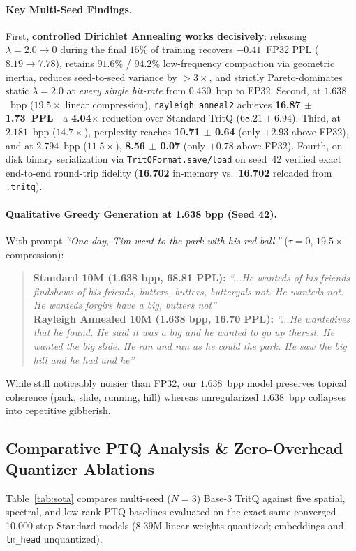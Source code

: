 \documentclass[11pt,a4paper]{article}
\begin{document}
\paragraph{Key Multi-Seed Findings.}
First, \textbf{controlled Dirichlet Annealing works decisively}: releasing $\lambda = 2.0 \to 0$ during the final $15\%$ of training recovers $-0.41$~FP32 PPL ($8.19 \to 7.78$), retains $91.6\%$ / $94.2\%$ low-frequency compaction via geometric inertia, reduces seed-to-seed variance by $>3\times$, and strictly Pareto-dominates static $\lambda=2.0$ at \emph{every single bit-rate} from $0.430$~bpp to FP32. Second, at $1.638$~bpp ($19.5\times$ linear compression), \texttt{rayleigh\_anneal2} achieves \textbf{16.87 $\pm$ 1.73~PPL}---a \textbf{4.04$\times$} reduction over Standard TritQ ($68.21 \pm 6.94$). Third, at $2.181$~bpp ($14.7\times$), perplexity reaches \textbf{10.71 $\pm$ 0.64} (only $+2.93$ above FP32), and at $2.794$~bpp ($11.5\times$), \textbf{8.56 $\pm$ 0.07} (only $+0.78$ above FP32). Fourth, on-disk binary serialization via \texttt{TritQFormat.save/load} on seed~42 verified exact end-to-end round-trip fidelity (\textbf{16.702} in-memory vs.\ \textbf{16.702} reloaded from \texttt{.tritq}).

\paragraph{Qualitative Greedy Generation at 1.638 bpp (Seed 42).}
With prompt \textit{``One day, Tim went to the park with his red ball.''} ($\tau = 0$, $19.5\times$ compression):
\begin{quote}
    \textbf{Standard 10M (1.638 bpp, 68.81 PPL):} \textit{``...He wanteds of his friends findshews of his friends, butters, butters, butteryals not. He wanteds not. He wanteds forgirs have a big, butters not''}\\
    \textbf{Rayleigh Annealed 10M (1.638 bpp, 16.70 PPL):} \textit{``...He wantedives that he found. He said it was a big and he wanted to go up therest. He wanted the big slide. He ran and ran as he could the park. He saw the big hill and he had and he''}
\end{quote}
While still noticeably noisier than FP32, our $1.638$~bpp model preserves topical coherence (park, slide, running, hill) whereas unregularized $1.638$~bpp collapses into repetitive gibberish.

\subsection{Comparative PTQ Analysis \& Zero-Overhead Quantizer Ablations}
\label{sec:ablation_geometry}
Table~\ref{tab:sota} compares multi-seed ($N=3$) Base-3 TritQ against five spatial, spectral, and low-rank PTQ baselines evaluated on the exact same converged 10,000-step Standard models ($8.39$M linear weights quantized; embeddings and \texttt{lm\_head} unquantized).
\end{document}
